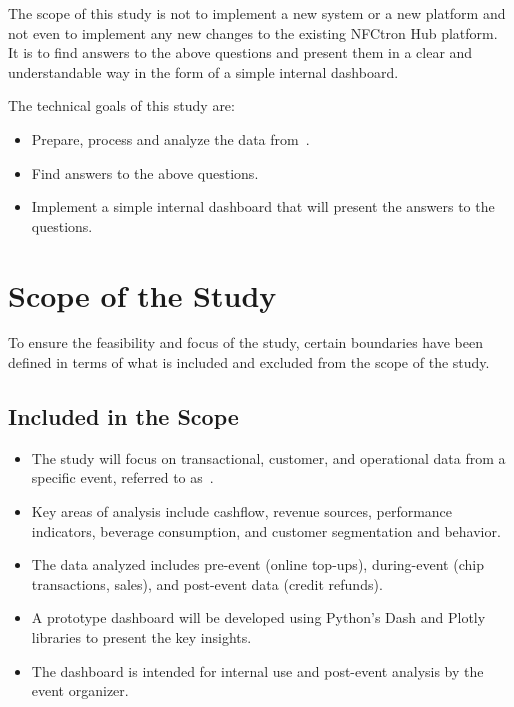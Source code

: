 The scope of this study is not to implement a new system or a new platform and not even to implement any new changes to the existing NFCtron Hub platform.
It is to find answers to the above questions and present them in a clear and understandable way in the form of a simple internal dashboard.

The technical goals of this study are:
\begin{itemize}
	\item Prepare, process and analyze the data from~\theEvent.
	\item Find answers to the above questions.
	\item Implement a simple internal dashboard that will present the answers to the questions.
\end{itemize}

\section*{Scope of the Study}
\label{sec:introduction-scope}
To ensure the feasibility and focus of the study, certain boundaries have been defined in terms of what is included and excluded from the scope of the study.

\subsection*{Included in the Scope}
\label{subsec:introduction-scope-included}
\begin{itemize}
	\item The study will focus on transactional, customer, and operational data from a specific event, referred to as~\theEvent.
	\item Key areas of analysis include cashflow, revenue sources, performance indicators, beverage consumption, and customer segmentation and behavior.
	\item The data analyzed includes pre-event (\eg online top-ups), during-event (\eg chip transactions, sales), and post-event data (\eg credit refunds).
	\item A prototype dashboard will be developed using Python’s Dash and Plotly libraries to present the key insights.
	\item The dashboard is intended for internal use and post-event analysis by the event organizer.
\end{itemize}

